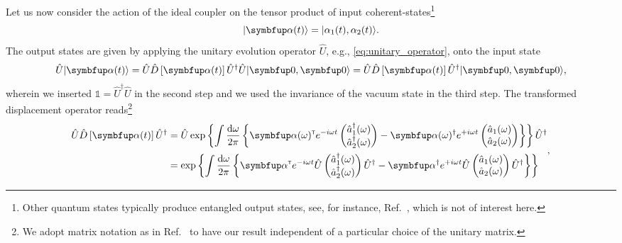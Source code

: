 Let us now consider the action of the ideal coupler on the tensor product of input coherent-states\footnote{Other quantum states typically produce entangled output states, see, for instance, Ref.~\cite{Windhager2011}, which is not of interest here.}
\begin{equation}
	\ket*{\vb{\alpha}(t)}
	=
	\ket*{\alpha_1(t),\alpha_2(t)}
	.
\end{equation}
The output states are given by applying the unitary evolution operator $\hat{U}$, e.g., \cref{eq:unitary_operator}, onto the input state
\begin{equation}
	\hat{U}
	\ket*{\vb{\alpha}(t)}
	=
	\hat{U}
	\hat{D}\left[\vb{\alpha}(t)\right]
	\hat{U}^\dagger
	\hat{U}
	\ket*{\vb{0},\vb{0}}
	=
	\hat{U}
	\hat{D}\left[\vb{\alpha}(t)\right]
	\hat{U}^\dagger
	\ket*{\vb{0},\vb{0}}
	,
\end{equation}
wherein we inserted $\mathbb{1}=\hat{U}^\dagger\hat{U}$ in the second step and we used the invariance of the vacuum state in the third step.
The transformed displacement operator reads\footnote{We adopt matrix notation as in Ref.~\cite[p.~206]{Vogel2006} to have our result independent of a particular choice of the unitary matrix.}
\begin{equation}
	\begin{split}
		\hat{U}
		\hat{D}\left[\vb{\alpha}(t)\right]
		\hat{U}^\dagger
		&=
		\hat{U}
		\exp\left\{
			\int\frac{\dd{\omega}}{2\pi}
			\left\{
				\vb{\alpha}(\omega)^\trans
				e^{-i\omega t}
				\begin{pmatrix}
					\hat{a}_1^\dagger(\omega) \\
					\hat{a}_2^\dagger(\omega)
				\end{pmatrix}
				-
				\vb{\alpha}(\omega)^\dagger
				e^{+i\omega t}
				\begin{pmatrix}
					\hat{a}_1(\omega) \\
					\hat{a}_2(\omega)
				\end{pmatrix}
			\right\}
		\right\}
		\hat{U}^\dagger
		\\
		&=
		\exp\left\{
			\int\frac{\dd{\omega}}{2\pi}
			\left\{
				\vb{\alpha}^\trans
				e^{-i\omega t}
				\hat{U}
				\begin{pmatrix}
					\hat{a}_1^\dagger(\omega) \\
					\hat{a}_2^\dagger(\omega)
				\end{pmatrix}
				\hat{U}^\dagger
				-
				\vb{\alpha}^\dagger
				e^{+i\omega t}
				\hat{U}
				\begin{pmatrix}
					\hat{a}_1(\omega) \\
					\hat{a}_2(\omega)
				\end{pmatrix}
				\hat{U}^\dagger
			\right\}
		\right\}
	\end{split}
	\label{eq:displacement_operator_transformed}
	,
\end{equation}
